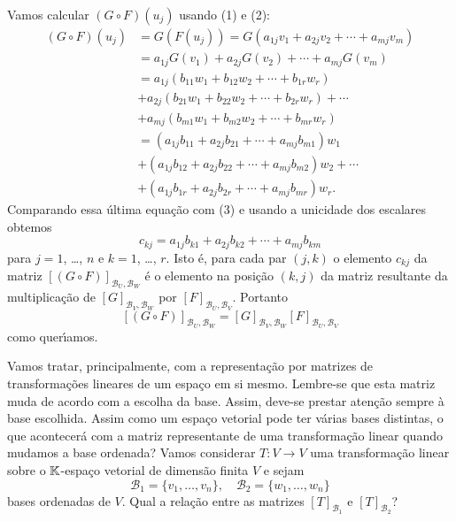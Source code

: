 \begin{prova}
	Vamos calcular $(G\circ F)(u_j)$ usando (1) e (2):
	\begin{align*}
		(G\circ F)(u_j) &= G(F(u_j)) = G(a_{1j}v_1 + a_{2j}v_2 + \cdots + a_{mj}v_m)\\
		&= a_{1j}G(v_1) + a_{2j}G(v_2) + \cdots + a_{mj}G(v_m)\\
		&= a_{1j}(b_{11}w_1 + b_{12}w_2 + \cdots + b_{1r}w_r) \\ &+ a_{2j}(b_{21}w_1 + b_{22}w_2 + \cdots + b_{2r}w_r) + \cdots \\ &+ a_{mj}(b_{m1}w_1 + b_{m2}w_2 + \cdots + b_{mr}w_r)\\
		&= (a_{1j}b_{11} + a_{2j}b_{21} + \cdots + a_{mj}b_{m1})w_1 \\ &+ (a_{1j}b_{12} + a_{2j}b_{22} + \cdots + a_{mj}b_{m2})w_2 + \cdots \\ &+ (a_{1j}b_{1r} + a_{2j}b_{2r} + \cdots + a_{mj}b_{mr})w_r.
	\end{align*}
	Comparando essa \'ultima equa\c{c}\~ao com (3) e usando a unicidade dos escalares obtemos
	\[
		c_{kj} = a_{1j}b_{k1} + a_{2j}b_{k2} + \cdots + a_{mj}b_{km}
	\]
	para $j=1$, \dots, $n$ e $k = 1$, \dots, $r$. Isto \'e, para cada par $(j,k)$ o elemento $c_{kj}$ da matriz $[(G\circ F)]_{{\mathcal{B}_U},{\mathcal{B}_W}}$ \'e o elemento na posi\c{c}\~ao $(k,j)$ da matriz resultante da multiplica\c{c}\~ao de $[G]_{{\mathcal{B}_V},{\mathcal{B}_W}}$ por $[F]_{{\mathcal{B}_U},{\mathcal{B}_V}}$. Portanto
	\[
		[(G\circ F)]_{{\mathcal{B}_U},{\mathcal{B}_W}} = [G]_{{\mathcal{B}_V},{\mathcal{B}_W}}[F]_{{\mathcal{B}_U},{\mathcal{B}_V}}
	\]
	como quer{\'\i}amos.
\end{prova}

Vamos tratar, principalmente, com a representa\c{c}\~ao por matrizes de transforma\c{c}\~oes lineares de um espa\c{c}o em si mesmo. Lembre-se que esta matriz muda de acordo com a escolha da base. Assim, deve-se prestar aten\c{c}\~ao sempre \`a base escolhida. Assim como um espa\c{c}o vetorial pode ter v\'arias bases distintas, o que acontecer\'a com a matriz representante de uma transforma\c{c}\~ao linear quando mudamos a base ordenada? Vamos considerar $T : V \to V$ uma transforma\c{c}\~ao linear sobre o $\mathbb{K}$-espa\c{c}o vetorial de dimens\~ao finita $V$ e sejam
\[
	\mathcal{B}_1 = \{v_1,\dots,v_n\}, \quad \mathcal{B}_2 = \{w_1,\dots,w_n\}
\]
bases ordenadas de $V$. Qual a rela\c{c}\~ao entre as matrizes $[T]_{\mathcal{B}_1}$ e $[T]_{\mathcal{B}_2}$?

